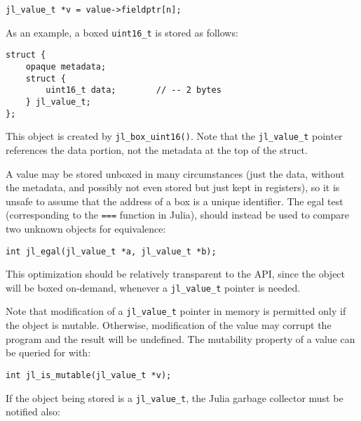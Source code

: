 \begin{lstlisting}
jl_value_t *v = value->fieldptr[n];
\end{lstlisting}



As an example, a {\textquotedbl}boxed{\textquotedbl} \texttt{uint16\_t} is stored as follows:




\begin{lstlisting}
struct {
    opaque metadata;
    struct {
        uint16_t data;        // -- 2 bytes
    } jl_value_t;
};
\end{lstlisting}



This object is created by \texttt{jl\_box\_uint16()}. Note that the \texttt{jl\_value\_t} pointer references the data portion, not the metadata at the top of the struct.



A value may be stored {\textquotedbl}unboxed{\textquotedbl} in many circumstances (just the data, without the metadata, and possibly not even stored but just kept in registers), so it is unsafe to assume that the address of a box is a unique identifier. The {\textquotedbl}egal{\textquotedbl} test (corresponding to the \texttt{===} function in Julia), should instead be used to compare two unknown objects for equivalence:




\begin{lstlisting}
int jl_egal(jl_value_t *a, jl_value_t *b);
\end{lstlisting}



This optimization should be relatively transparent to the API, since the object will be {\textquotedbl}boxed{\textquotedbl} on-demand, whenever a \texttt{jl\_value\_t} pointer is needed.



Note that modification of a \texttt{jl\_value\_t} pointer in memory is permitted only if the object is mutable. Otherwise, modification of the value may corrupt the program and the result will be undefined. The mutability property of a value can be queried for with:




\begin{lstlisting}
int jl_is_mutable(jl_value_t *v);
\end{lstlisting}



If the object being stored is a \texttt{jl\_value\_t}, the Julia garbage collector must be notified also:




